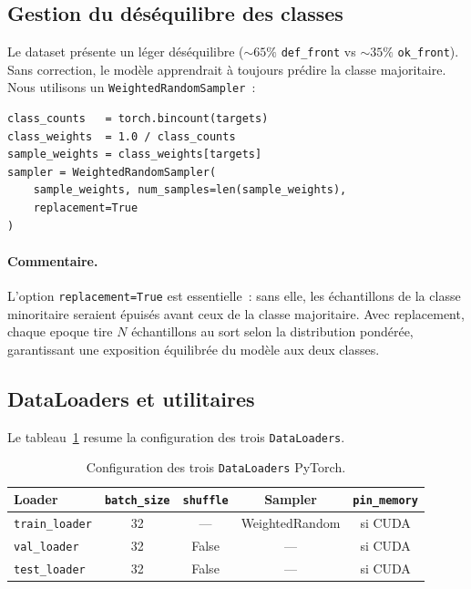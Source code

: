 \documentclass[12pt,a4paper,openany]{report}
\begin{document}
\subsection{Gestion du déséquilibre des classes}

Le dataset présente un léger déséquilibre ($\sim 65\%$ \texttt{def\_front} vs $\sim 35\%$ \texttt{ok\_front}). Sans correction, le modèle apprendrait à toujours prédire la classe majoritaire. Nous utilisons un \texttt{WeightedRandomSampler}~:

\begin{lstlisting}[caption={Pondération inverse-fréquence des échantillons.}]
class_counts   = torch.bincount(targets)
class_weights  = 1.0 / class_counts
sample_weights = class_weights[targets]
sampler = WeightedRandomSampler(
    sample_weights, num_samples=len(sample_weights),
    replacement=True
)
\end{lstlisting}

\paragraph{Commentaire.}
L'option \texttt{replacement=True} est essentielle~: sans elle, les échantillons de la classe minoritaire seraient épuisés avant ceux de la classe majoritaire. Avec replacement, chaque epoque tire $N$ échantillons au sort selon la distribution pondérée, garantissant une exposition équilibrée du modèle aux deux classes.

\subsection{DataLoaders et utilitaires}

Le tableau~\ref{tab:loaders} resume la configuration des trois \texttt{DataLoaders}.

\begin{table}[H]
\centering
\begin{tabular}{lcccc}
\toprule
\textbf{Loader} & \texttt{batch\_size} & \texttt{shuffle} & \textbf{Sampler} & \texttt{pin\_memory} \\
\midrule
\texttt{train\_loader} & 32 & --- & WeightedRandom & si CUDA \\
\texttt{val\_loader}   & 32 & False & --- & si CUDA \\
\texttt{test\_loader}  & 32 & False & --- & si CUDA \\
\bottomrule
\end{tabular}
\caption{Configuration des trois \texttt{DataLoaders} PyTorch.}
\label{tab:loaders}
\end{table}
\end{document}
